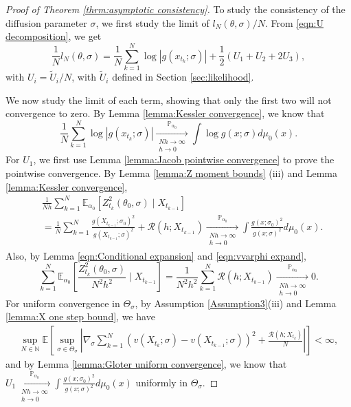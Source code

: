 \documentclass[a4paper,12pt]{article}
\numberwithin{equation}{section}
\theoremstyle{plain}
\theoremstyle{definition}
\begin{document}
\begin{appendix}
\begin{proof}[Proof of Theorem \ref{thrm:asymptotic consistency}]
To study the consistency of the diffusion parameter $\sigma$, we first study the limit of $l_N(\theta,\sigma)/N$. From \eqref{eqn:U decomposition}, we get 
\begin{equation}\label{eqn:U decomposition2}
        \frac{1}{N}l_N(\theta,\sigma)=\frac{1}{N}\sum_{k=1}^{N}\log |g(x_{t_k};\sigma)|+\frac{1}{2}\left(U_1+U_2+2U_3\right),
        \end{equation}
      with $U_i = \tilde U_i/N$, with $\tilde U_i$ defined in Section \ref{sec:likelihood}.

   We now study the limit of each term, showing that only the first two will not convergence to zero. By Lemma \ref{lemma:Kessler convergence}, we know that
    \begin{equation}\label{eqn:Consistency log g}
        \frac{1}{N}\sum_{k=1}^{N}\log |g(x_{t_k};\sigma)|\xrightarrow[\substack{N h\rightarrow\infty \\ h \rightarrow 0}]{\mathbb{P}_{\alpha_0}}\int\log g(x;\sigma)d\mu_0(x).
    \end{equation}
    For $U_1$, we first use Lemma \ref{lemma:Jacob pointwise convergence} to prove the pointwise convergence. By Lemma \ref{lemma:Z moment bounds} (iii) and Lemma \ref{lemma:Kessler convergence},
    \begin{align*}
       &\frac{1}{Nh}\sum_{k=1}^N\mathbb{E}_{\alpha_0}\left[Z_{t_k}^2(\theta_0,\sigma)\mid X_{t_{k-1}}\right]\\
        &=\frac{1}{N}\sum_{k=1}^N \frac{g(X_{t_{k-1}};\sigma_0)^2}{g(X_{t_{k-1}};\sigma)^2}+\mathcal{R}(h;X_{t_{k-1}})\xrightarrow[\substack{N h\rightarrow\infty \\ h \rightarrow 0}]{\mathbb{P}_{\alpha_0}}\int\frac{g(x;\sigma_0)^2}{g(x;\sigma)^2}d\mu_0(x).
    \end{align*}
    Also, by Lemma \ref{eqn:Conditional expansion} and \eqref{eqn:vvarphi expand},
    \begin{equation*}
        \sum_{k=1}^{N}\mathbb{E}_{\alpha_0}\left[\frac{Z^2_{t_k}(\theta_0,\sigma)}{N^2h^2}\mid X_{t_{k-1}}\right]=\frac{1}{N^2h^2}\sum_{k=1}^N \mathcal{R}(h;X_{t_{k-1}})\xrightarrow[\substack{N h\rightarrow\infty \\ h \rightarrow 0}]{\mathbb{P}_{\alpha_0}}0.
    \end{equation*}
    For uniform convergence in $\Theta_{\sigma}$, by Assumption \ref{Assumption3}(iii) and Lemma \ref{lemma:X one step bound}, we have
    \begin{align*}
        \sup_{N\in \mathbb{N}}\mathbb{E}\left[\sup_{\sigma\in \Theta_{\sigma}}\left|\nabla_{\sigma} \sum_{k=1}^{N}(v(X_{t_k};\sigma)-v(X_{t_{k-1}};\sigma))^2+\frac{\mathcal{R}(h;X_{t_k})}{N}\right|\right]
        <\infty,
    \end{align*}
    and by Lemma \ref{lemma:Gloter uniform convergence}, we know that $U_1\xrightarrow[\substack{N h\rightarrow\infty \\ h \rightarrow 0}]{\mathbb{P}_{\alpha_0}}\int\frac{g(x;\sigma_0)^2}{g(x;\sigma)^2}d\mu_0(x)$ uniformly in $\Theta_{\sigma}$.


\end{proof}
\end{appendix}
\end{document}
